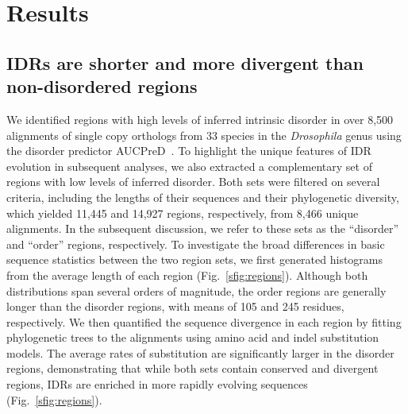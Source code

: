 
\section{Results}
\subsection{IDRs are shorter and more divergent than non-disordered regions}
We identified regions with high levels of inferred intrinsic disorder in over 8,500 alignments of single copy orthologs from 33 species in the \textit{Drosophila} genus using the disorder predictor AUCPreD~\cite{Wang2016}. To highlight the unique features of IDR evolution in subsequent analyses, we also extracted a complementary set of regions with low levels of inferred disorder. Both sets were filtered on several criteria, including the lengths of their sequences and their phylogenetic diversity, which yielded 11,445 and 14,927 regions, respectively, from 8,466 unique alignments. In the subsequent discussion, we refer to these sets as the ``disorder'' and ``order'' regions, respectively. To investigate the broad differences in basic sequence statistics between the two region sets, we first generated histograms from the average length of each region (Fig.~\ref{sfig:regions}). Although both distributions span several orders of magnitude, the order regions are generally longer than the disorder regions, with means of 105 and 245 residues, respectively. We then quantified the sequence divergence in each region by fitting phylogenetic trees to the alignments using amino acid and indel substitution models. The average rates of substitution are significantly larger in the disorder regions, demonstrating that while both sets contain conserved and divergent regions, IDRs are enriched in more rapidly evolving sequences (Fig.~\ref{sfig:regions}).

